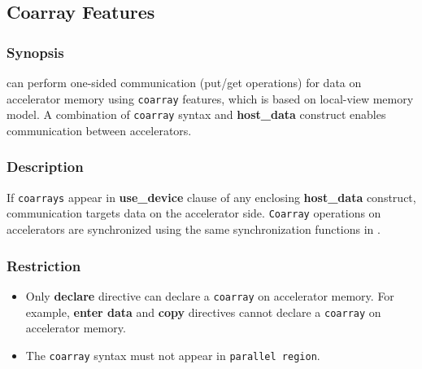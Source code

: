 \subsection{Coarray Features} \label{sec:coarray}
\subsubsection*{Synopsis}
{\XACC} can perform one-sided communication (put/get operations) for data on accelerator memory using {\tt coarray} features,
which is based on {\XMP} local-view memory model.
A combination of {\tt coarray} syntax and {\OACC} {\bf host\_data} construct enables communication between accelerators.

\subsubsection*{Description}
If {\tt coarrays} appear in {\OACC} {\bf use\_device} clause of any {\OACC} enclosing {\bf host\_data} construct, 
communication targets data on the accelerator side. 
{\tt Coarray} operations on accelerators are synchronized using the same synchronization functions in {\XMP}.

\subsubsection*{Restriction}
\begin{itemize}
 \item Only {\OACC} {\bf declare} directive can declare a {\tt coarray} on accelerator memory.
   For example,
   {\OACC} {\bf enter data} and {\bf copy} directives cannot declare a {\tt coarray} on accelerator memory.
 \item The {\tt coarray} syntax must not appear in {\OACC} {\tt parallel region}.
\end{itemize}

